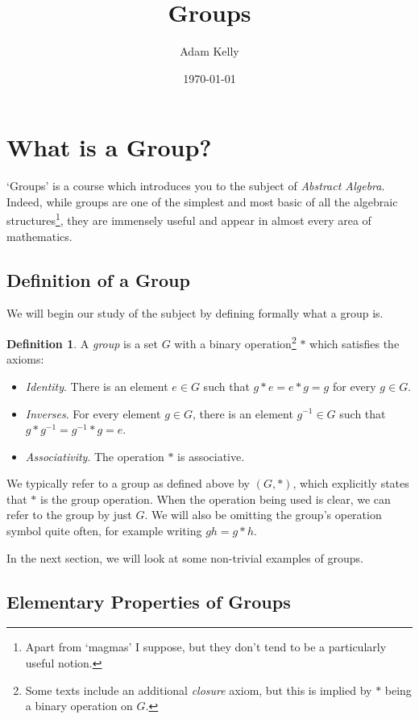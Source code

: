 \documentclass[11pt, a4paper]{article}
\title{\vspace{-2cm}Groups}
\author{Adam Kelly}
\date{\today}
\theoremstyle{definition}
\newtheorem{definition}[theorem]{Definition}
\newcommand{\vocab}[1]{\emph{#1}}
\begin{document}
\maketitle

\section{What is a Group?}

`Groups' is a course which introduces you to the subject of \emph{Abstract Algebra}.
Indeed, while groups are one of the simplest and most basic of all the algebraic structures\footnote{Apart from `magmas' I suppose, but they don't tend to be a particularly useful notion.}, they are immensely useful and appear in almost every area of mathematics. 

\subsection{Definition of a Group}

We will begin our study of the subject by defining formally what a group is.

\begin{definition}
	A \vocab{group} is a set $G$ with a binary operation\footnote{Some texts include an additional \emph{closure} axiom, but this is implied by $*$ being a binary operation on $G$.} $*$ which satisfies the axioms:
	\begin{itemize}
		\item \emph{Identity}. There is an element $e \in G$ such that $g * e = e * g = g$ for every $g \in G$.
		\item \emph{Inverses}. For every element $g \in G$, there is an element $g^{-1} \in G$ such that $g * g^{-1} = g^{-1} * g = e$.
		\item \emph{Associativity}. The operation $*$ is associative.
	\end{itemize}
\end{definition}

We typically refer to a group as defined above by $(G, *)$, which explicitly states that $*$ is the group operation. When the operation being used is clear, we can refer to the group by just $G$. We will also be omitting the group's operation symbol quite often, for example writing $gh = g * h$. 

 In the next section, we will look at some non-trivial examples of groups.

\subsection{Elementary Properties of Groups}
\end{document}
